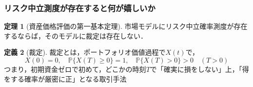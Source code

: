 \documentclass[a4paper, lualatex, ja=standard]{bxjsarticle}
\theoremstyle{definition}
\newtheorem{thm}{定理}[subsection]
\newtheorem{dfn}[thm]{定義}
\renewcommand{\P}{\mathbb{P}}
\begin{document}
\subsubsection*{リスク中立測度が存在すると何が嬉しいか}
\setcounter{thm}{6}
\begin{thm}[資産価格評価の第一基本定理]
  市場モデルにリスク中立確率測度が存在するならば，そのモデルに裁定は存在しない．
\end{thm}
\setcounter{thm}{5}
\begin{dfn}[裁定]
  裁定とは，ポートフォリオ価値過程で$X(t)$で，
  \begin{equation}
    X(0)=0,\quad\P\{X(T)\geq 0\}=1,\quad\P\{X(T)>0\}>0\quad(T>0)
  \end{equation}
  つまり，初期資金ゼロで初めて，どこかの時刻$T$で「確実に損をしない」上，「得をする確率が厳密に正」となる取引手法
\end{dfn}
\end{document}
